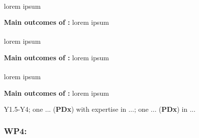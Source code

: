\paragraph{\TCA}

lorem ipsum

\begin{framed}
    {\noindent\bf Main outcomes of \tCA:} lorem ipsum 
\end{framed}

\paragraph{\TCB}

lorem ipsum

\begin{framed}
    {\noindent\bf Main outcomes of \tCB:} lorem ipsum 
\end{framed}

\paragraph{\TCC}

lorem ipsum

\begin{framed}
    {\noindent\bf Main outcomes of \tCC:} lorem ipsum 
\end{framed}


\begin{framed}
     Y1.5-Y4; one ... ({\bf PDx}) with expertise in
    ...; one ... ({\bf PDx}) in ...
\end{framed}











\subsubsection{WP4: \textbf{\WPD}}


